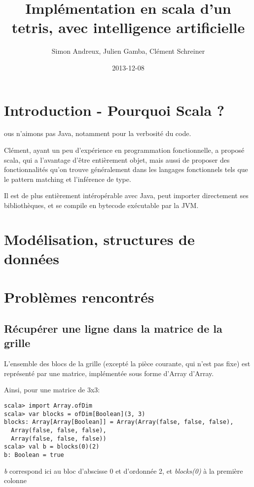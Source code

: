 \documentclass[11pt]{article}
\author{Simon Andreux, Julien Gamba, Clément Schreiner}
\date{2013-12-08}
\title{Implémentation en scala d'un tetris, avec intelligence artificielle}
\begin{document}
\maketitle
\tableofcontents



\section{Introduction - Pourquoi Scala ?}
\label{sec-1}

ous n'aimons pas Java, notamment pour la verbosité du code.

Clément, ayant un peu d'expérience en programmation fonctionnelle, a
proposé scala, qui a l'avantage d'être entièrement objet, mais aussi
de proposer des fonctionnalités qu'on trouve généralement dans les
langages fonctionnels tels que le pattern matching et l'inférence de
type.

Il est de plus entièrement intéropérable avec Java, peut importer directement ses bibliothèques, et se compile en bytecode exécutable par la JVM.
\section{Modélisation, structures de données}
\label{sec-2}



\section{Problèmes rencontrés}
\label{sec-3}

\subsection{Récupérer une ligne dans la matrice de la grille}
\label{sec-3-1}

L'ensemble des blocs de la grille (excepté la pièce courante, qui n'est pas fixe) est représenté par une matrice, implémentée sous forme d'Array d'Array.

Ainsi, pour une matrice de 3x3:

\begin{verbatim}
scala> import Array.ofDim
scala> var blocks = ofDim[Boolean](3, 3)
blocks: Array[Array[Boolean]] = Array(Array(false, false, false),
  Array(false, false, false),
  Array(false, false, false))
scala> val b = blocks(0)(2)
b: Boolean = true
\end{verbatim}

\emph{b} correspond ici au bloc d'abscisse 0 et d'ordonnée 2, et \emph{blocks(0)} à la première colonne
\end{document}
